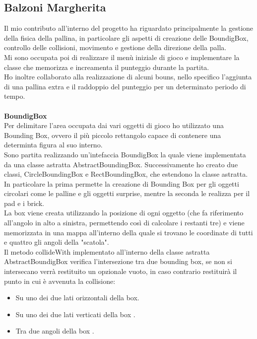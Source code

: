 \documentclass[a4paper,12pt]{report}
\begin{document}
\subsection{Balzoni Margherita}
Il mio contributo all'interno del progetto ha riguardato principalmente la gestione della fisica della pallina, in particolare gli aspetti di creazione delle BoundigBox, controllo delle collisioni, movimento e gestione della direzione della palla.
\\Mi sono occupata poi di realizzare il menù iniziale di gioco e implementare la classe che memorizza e increamenta il punteggio durante la partita.
\\Ho inoltre collaborato alla realizzazione di alcuni bouns, nello specifico l'aggiunta di una pallina extra e il raddoppio del punteggio per un determinato periodo di tempo.\\\\
\textbf{BoundigBox}\\
Per delimitare l'area occupata dai vari oggetti di gioco ho utilizzato una Bounding Box, ovvero il più piccolo rettangolo capace di contenere una determinta figura al suo interno.\\
Sono partita realizzando un'intefaccia BoundigBox la quale viene implementata da una classe astratta AbstractBoundingBox.
Successivamente ho creato due classi, CircleBoundingBox e RectBoundingBox, che estendono la classe astratta. In particolare la prima permette la creazione di Bounding Box per gli oggetti circolari come le palline e gli oggetti surprise, mentre la seconda le realizza per il pad e i brick.
\\La box viene creata utilizzando la posizione di ogni oggetto (che fa riferimento all'angolo in alto a sinistra, permettendo così di calcolare i restanti tre) e viene memorizzata in una mappa all'interno della quale si trovano le coordinate di tutti e quattro gli angoli della "scatola".
\\Il metodo collideWith implementato all'interno della classe astratta AbstractBoundigBox verifica l'intersezione tra due bounding box, se non si intersecano verrà restituito un opzionale vuoto, in caso contrario restituirà il punto in cui è avvenuta la collisione:
\begin{itemize}
    \item  Su uno dei due lati orizzontali della box.
    \item  Su uno dei due lati verticati della box .
    \item  Tra due angoli della box .

\end{itemize}
\end{document}
